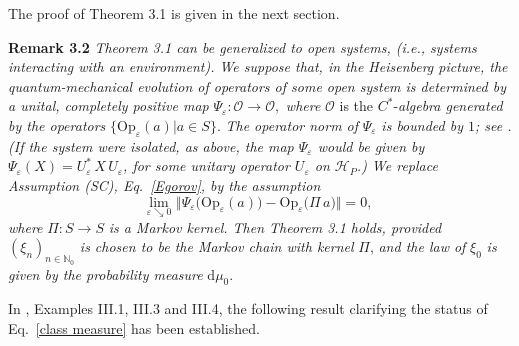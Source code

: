 \documentclass[12pt]{article}
\begin{document}
The proof of Theorem 3.1 is given in the next section.

\vspace{0.15cm}\noindent
{\bf{Remark 3.2}} \textit{Theorem 3.1 can be generalized to open systems, (i.e., systems interacting with an environment).
We suppose that, in the Heisenberg picture, the quantum-mechanical evolution of operators of some open system 
is determined by a unital, completely positive map} \mbox{$\Psi_{\varepsilon} : \mathcal{O} \rightarrow \mathcal{O},$}
\textit{where} $\mathcal{O}$ is the $C^{*}$-\textit{algebra  generated by the operators} 
$\big\{\text{Op}_{\varepsilon}(a)\big| a\in S\big\}$.
\textit{The operator norm of} $\Psi_{\varepsilon}$ \textit{is bounded by $1$; see \cite{RD}. (If the system were isolated, 
as above, the map $\Psi_{\varepsilon}$ would be given by $\Psi_{\varepsilon}(X)=U_{\varepsilon}^{*} \,X\, U_{\varepsilon}$, 
for some unitary operator $U_{\varepsilon}$ on $\mathcal{H}_P$.) We replace Assumption (SC), Eq.~\eqref{Egorov}, 
by the assumption}
$$\underset{\varepsilon \searrow 0}{\text{lim}}\,\, \Vert \Psi_{\varepsilon} \big(\text{Op}_{\varepsilon} (a)\big) - 
\text{Op}_{\varepsilon}\big(\Pi \,a\big) \Vert =0,$$
\textit{where} $\Pi: S\rightarrow S$ \textit{is a Markov kernel. Then Theorem 3.1 holds, provided}
 $(\xi_n)_{n \in \mathbb{N}_0}$ \textit{is chosen to be the Markov chain with kernel} $\Pi$, \textit{and the law of} 
 $\xi_0$ \textit{is given by the probability measure} $\text{d}\mu_0$.


\vspace{0.15cm}
In \cite{L-P}, Examples III.1, III.3 and III.4, the following result clarifying the status of Eq.~\eqref{class measure} has been established.
\end{document}

